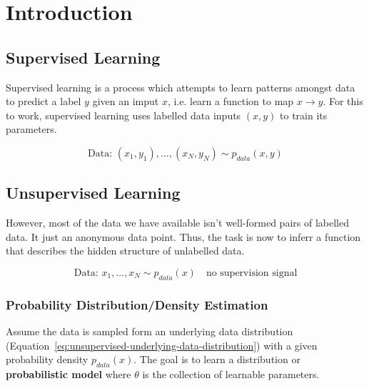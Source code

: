 \documentclass[11pt]{article}
\begin{document}


\tableofcontents

\clearpage

\section{Introduction}\label{sect:Introduction}

\subsection{Supervised Learning}\label{sect:Supervised Learning}

Supervised learning is a process which attempts to learn patterns amongst data to predict a label $y$ given an imput $x$, i.e. learn a function to map $x\rightarrow y$. For this to work, supervised learning uses labelled data inputs $(x,y)$ to train its parameters.

\begin{equation}\label{eq:supervised-underlying-data-distribution}
    \text{Data: } (x_1, y_1), \dots , (x_N, y_N) \sim p_{data}(x,y)
\end{equation}

\subsection{Unsupervised Learning}\label{sect:Unsupervised Learning}

However, most of the data we have available isn't well-formed pairs of labelled data. It just an anonymous data point. Thus, the task is now to inferr a function that describes the hidden structure of unlabelled data.

\begin{equation}\label{eq:unsupervised-underlying-data-distribution}
    \text{Data: } x_1, \dots , x_N \sim p_{data}(x) \quad \text{no supervision signal}
\end{equation}

\subsubsection{Probability Distribution/Density Estimation}\label{sect:Probability Distribution/Density Estimation}

Assume the data is sampled form an underlying data distribution (Equation~\ref{eq:unsupervised-underlying-data-distribution}) with a given probability density $p_{data}(x)$. The goal is to learn a distribution or \textbf{probabilistic model} where $\theta$ is the collection of learnable parameters.
\end{document}
